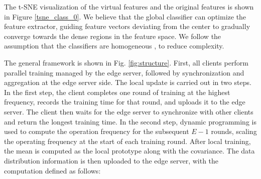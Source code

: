 \documentclass[journal]{IEEEtran}
\begin{document}
The t-SNE visualization of the virtual features and the original features is shown in Figure \ref{tsne_class_0}. We believe that the global classifier can optimize the feature extractor, guiding feature vectors deviating from the center to gradually converge towards the dense regions in the feature space. We follow the assumption that the classifiers are homogeneous \cite{tan_fedproto_2021,zhang_fedtgp_2024}, to reduce complexity.


The general framework is shown in Fig. \ref{fig:structure}. First, all clients perform parallel training managed by the edge server, followed by synchronization and aggregation at the edge server side. The local update is carried out in two steps. In the first step, the client completes one round of training at the highest frequency, records the training time for that round, and uploads it to the edge server. The client then waits for the edge server to synchronize with other clients and return the longest training time. In the second step, dynamic programming is used to compute the operation frequency for the subsequent $E-1$ rounds, scaling the operating frequency at the start of each training round. After local training, the mean is computed as the local prototype along with the covariance. The data distribution information is then uploaded to the edge server, with the computation defined as follows:
\end{document}
